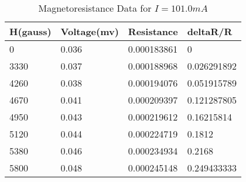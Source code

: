 
\begin{table}[]
	\centering
	\begin{tabular}{|l|l|l|l|}
	\hline
		H(gauss) & Voltage(mv) & Resistance & deltaR/R \\ \hline
		0 & 0.036 & 0.000183861 & 0 \\ \hline
		3330 & 0.037 & 0.000188968 & 0.026291892 \\ \hline
		4260 & 0.038 & 0.000194076 & 0.051915789 \\ \hline
		4670 & 0.041 & 0.000209397 & 0.121287805 \\ \hline
		4950 & 0.043 & 0.000219612 & 0.16215814 \\ \hline
		5120 & 0.044 & 0.000224719 & 0.1812 \\ \hline
		5380 & 0.046 & 0.000234934 & 0.2168 \\ \hline
		5800 & 0.048 & 0.000245148 & 0.249433333 \\ \hline
	\end{tabular}
	\caption{Magnetoresistance Data for $I=101.0mA$}
	\label{tab:mag2}
\end{table}